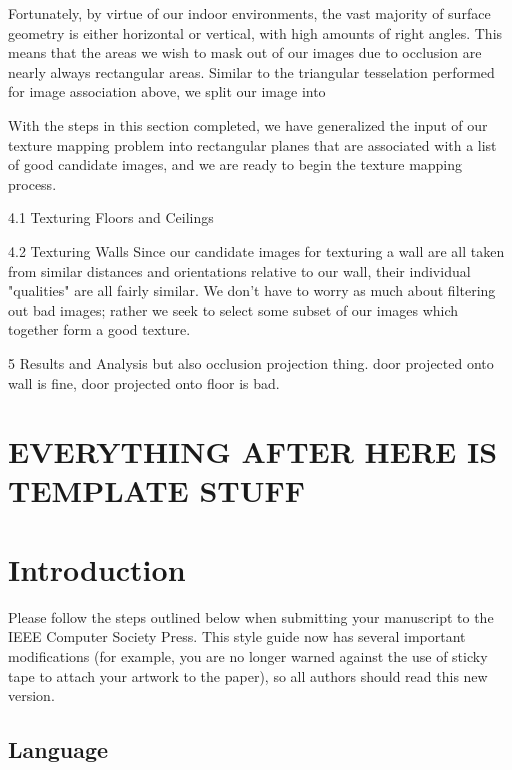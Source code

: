 \documentclass[10pt,twocolumn,letterpaper]{article}
\begin{document}
Fortunately, by virtue of our indoor environments, the vast majority
of surface geometry is either horizontal or vertical, with high
amounts of right angles. This means that the areas we wish to mask out
of our images due to occlusion are nearly always rectangular
areas. Similar to the triangular tesselation performed for image
association above, we split our image into






With the steps in this section completed, we have generalized the
input of our texture mapping problem into rectangular planes that are
associated with a list of good candidate images, and we are ready to
begin the texture mapping process.






4.1 Texturing Floors and Ceilings




4.2 Texturing Walls Since our candidate images for texturing a wall
are all taken from similar distances and orientations relative to our
wall, their individual "qualities" are all fairly similar. We don't
have to worry as much about filtering out bad images; rather we seek
to select some subset of our images which together form a good
texture.

5 Results and Analysis but also occlusion projection thing. door
projected onto wall is fine, door projected onto floor is bad.

\section{EVERYTHING AFTER HERE IS TEMPLATE STUFF}






\section{Introduction}

Please follow the steps outlined below when submitting your manuscript
to the IEEE Computer Society Press.  This style guide now has several
important modifications (for example, you are no longer warned against
the use of sticky tape to attach your artwork to the paper), so all
authors should read this new version.

\subsection{Language}
\end{document}
